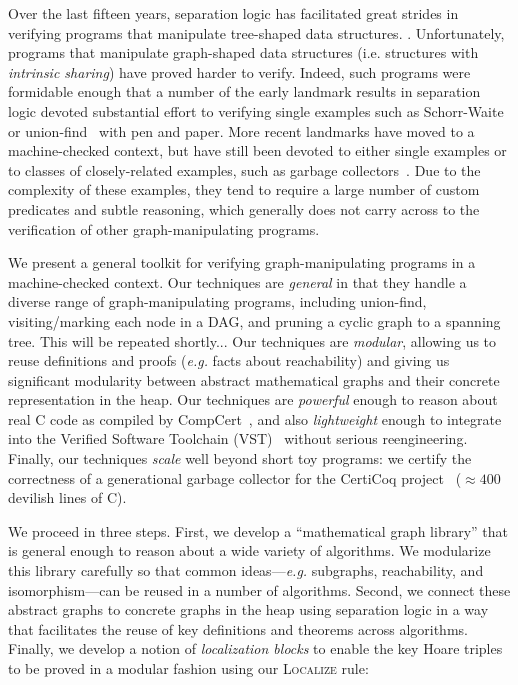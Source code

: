 Over the last fifteen years, separation logic has facilitated great strides 
in verifying programs that manipulate tree-shaped data structures. 
\citep{berdine:smallfoot,chin:hipsleek,jacobs:verifast,
chlipala:bedrock,bengtson:charge,appel:programlogics}. 
Unfortunately, programs that manipulate graph-shaped data structures 
(i.e. structures with \emph{intrinsic sharing}) have proved harder to verify.  
Indeed, such programs were formidable enough that a number of the early 
landmark results in separation logic devoted substantial effort to verifying 
single examples such as Schorr-Waite~\cite{hongseok:phd} or 
union-find~\cite{neelthesis} with pen and paper.  
More recent landmarks have moved to a machine-checked context, but have still
been devoted to either single examples or to classes of closely-related examples, 
such as garbage collectors~\cite{blah,cakemlgc}.
Due to the complexity of these examples, they tend to require a large number 
of custom predicates and subtle reasoning, which generally does not carry across 
to the verification of other graph-manipulating programs.

We present a general toolkit for verifying graph-manipulating programs in a 
machine-checked context. Our techniques are \emph{general} in that they handle a diverse 
range of graph-manipulating programs, {\color{blue}including union-find, visiting/marking 
each node in a DAG, and pruning a cyclic graph to a spanning tree.} {\color{magenta}This 
will be repeated shortly...}
Our techniques are \emph{modular}, allowing us to reuse definitions and proofs 
(\emph{e.g.} facts about reachability) and giving us {\color{magenta} significant 
modularity} between abstract mathematical graphs and their concrete representation 
in the heap.
Our techniques are \emph{powerful} enough to reason about real C code as compiled by 
CompCert~\cite{blah}, and also \emph{lightweight} enough to integrate into the Verified 
Software Toolchain (VST)~\cite{appel:programlogics} without serious reengineering.
Finally, our techniques \emph{scale} well beyond short toy programs: we certify the 
correctness of a generational garbage collector for the CertiCoq project~\cite{blah} 
($\approx400$ devilish lines of C).

We proceed in three steps. First, we develop a ``mathematical graph library'' that is general enough to reason about a wide variety of algorithms.  We modularize this library carefully so that common ideas---\emph{e.g.} subgraphs, reachability, and isomorphism---can be reused in a number of algorithms.  
Second, we connect these abstract graphs to
concrete graphs in the heap using separation logic in a way that facilitates the reuse of key definitions and theorems across algorithms.  Finally, we develop a notion of \emph{localization blocks} to
enable the key Hoare triples to be proved in a modular fashion using our \textsc{Localize}
rule:

